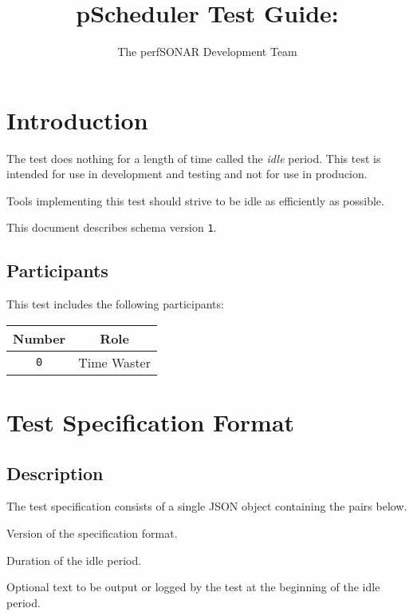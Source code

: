 \documentclass[10pt]{article}
\title{pScheduler Test Guide: {\it \testname}}
\author{The perfSONAR Development Team}
\begin{document}
\maketitle


%
%

\section{Introduction}

The {\tt \testname} test does nothing for a length of time called the
{\it idle} period.  This test is intended for use in development and
testing and not for use in producion.

Tools implementing this test should strive to be idle as efficiently
as possible.

This document describes schema version {\tt 1}.

\subsection{Participants}

This test includes the following participants:

\begin{center}
\begin{tabular}{|c|c|}
\hline
{\bf Number} & {\bf Role} \\
\hline
{\tt 0} & Time Waster \\
\hline
\end{tabular}
\end{center}



%
%

\section{Test Specification Format}

\subsection{Description}

The test specification consists of a single JSON object containing the
pairs below.  \seejson


 Version of the specification format.

 Duration of the idle period.

 Optional text to be output or
logged by the test at the beginning of the idle period.
\end{document}
